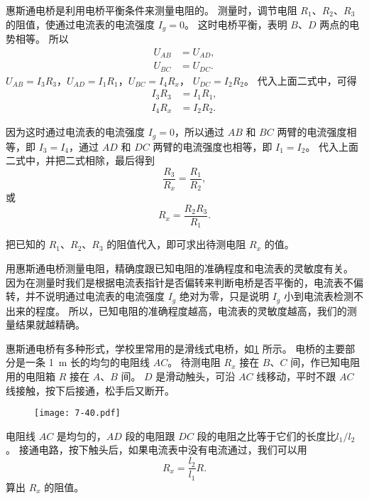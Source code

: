 \medskip
惠斯通电桥是利用电桥平衡条件来测量电阻的。
测量时，调节电阻 $R_1$、$R_2$、$R_3$ 的阻值，使通过电流表的电流强度 $I_g=0$。
这时电桥平衡，表明 $B$、$D$ 两点的电势相等。
所以
\[\begin{split}
    U_{AB}&=U_{AD},\\
    U_{BC}&=U_{DC}.
\end{split}\]
$U_{AB}=I_3R_3$，$U_{AD}=I_1R_1$，$U_{BC}=I_4R_x$， $U_{DC}=I_2R_2$。
代入上面二式中，可得
\[\begin{split}
  I_3R_3 & =I_1R_1,\\
  I_4R_x & =I_2R_2.
\end{split}\]

因为这时通过电流表的电流强度 $I_g=0$，所以通过 $AB$ 和 $BC$ 两臂的电流强度相等，即 $I_3=I_4$，通过 $AD$ 和 $DC$ 两臂的电流强度也相等，即 $I_1=I_2$。
代入上面二式中，并把二式相除，最后得到
\[\frac{R_3}{R_x}=\frac{R_1}{R_2},\]
或
\[R_x=\frac{R_2R_3}{R_1}.\]

把已知的 $R_1$、$R_2$、$R_3$ 的阻值代入，即可求出待测电阻 $R_x$ 的值。

用惠斯通电桥测量电阻，精确度跟已知电阻的准确程度和电流表的灵敏度有关。
因为在测量时我们是根据电流表指针是否偏转来判断电桥是否平衡的，电流表不偏转，并不说明通过电流表的电流强度 $I_g$ 绝对为零，只是说明 $I_g$ 小到电流表检测不出来的程度。
所以，已知电阻的准确程度越高，电流表的灵敏度越高，我们的测量结果就越精确。

惠斯通电桥有多种形式，学校里常用的是滑线式电桥，如\cref{fig:7-40} 所示。
电桥的主要部分是一条 \qty{1}{m} 长的均匀的电阻线 $AC$。
待测电阻 $R_x$ 接在 $B$、$C$ 间，作已知电阻用的电阻箱 $R$ 接在 $A$、$B$ 间。
$D$ 是滑动触头，可沿 $AC$ 线移动，平时不跟 $AC$ 线接触，按下后接通，松手后又断开。
\begin{figure}
  \texttt{[image: 7-40.pdf]}
	\caption{}\label{fig:7-40}
\end{figure}

电阻线 $AC$ 是均匀的，$AD$ 段的电阻跟 $DC$ 段的电阻之比等于它们的长度比$l_1/l_2$。
接通电路，按下触头后，如果电流表中没有电流通过，我们可以用
\[R_x=\frac{l_2}{l_1}R.\]
算出 $R_x$ 的阻值。

